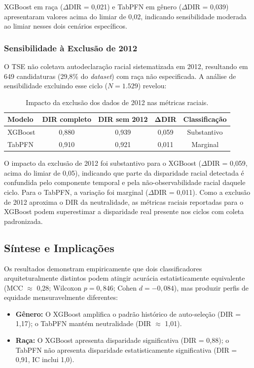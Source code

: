 \documentclass[12pt]{article}
\begin{document}
XGBoost em raça ($\Delta$DIR = 0{,}021) e TabPFN em gênero ($\Delta$DIR = 0{,}039) apresentaram valores acima do limiar de 0{,}02, indicando sensibilidade moderada ao limiar nesses dois cenários específicos.

\subsubsection{Sensibilidade à Exclusão de 2012}

O TSE não coletava autodeclaração racial sistematizada em 2012, resultando em 649 candidaturas (29,8\% do \textit{dataset}) com raça não especificada. A análise de sensibilidade excluindo esse ciclo ($N = 1.529$) revelou:

\begin{table}[htbp]
\centering
\caption{Impacto da exclusão dos dados de 2012 nas métricas raciais.}
\label{tab:sensibilidade_2012}
\begin{tabular}{lcccc}
\hline
\textbf{Modelo} & \textbf{DIR completo} & \textbf{DIR sem 2012} & $\boldsymbol{\Delta}$\textbf{DIR} & \textbf{Classificação} \\
\hline
XGBoost & 0,880 & 0,939 & 0,059 & Substantivo \\
TabPFN  & 0,910 & 0,921 & 0,011 & Marginal \\
\hline
\end{tabular}
\end{table}

O impacto da exclusão de 2012 foi substantivo para o XGBoost ($\Delta$DIR = 0{,}059, acima do limiar de 0{,}05), indicando que parte da disparidade racial detectada é confundida pelo componente temporal e pela não-observabilidade racial daquele ciclo. Para o TabPFN, a variação foi marginal ($\Delta$DIR = 0{,}011). Como a exclusão de 2012 aproxima o DIR da neutralidade, as métricas raciais reportadas para o XGBoost podem superestimar a disparidade real presente nos ciclos com coleta padronizada.

\subsection{Síntese e Implicações}

Os resultados demonstram empiricamente que dois classificadores arquiteturalmente distintos podem atingir acurácia estatisticamente equivalente (MCC $\approx$ 0,28; Wilcoxon $p = 0{,}846$; Cohen $d = -0{,}084$), mas produzir perfis de equidade mensuravelmente diferentes:

\begin{itemize}
  \item \textbf{Gênero:} O XGBoost amplifica o padrão histórico de auto-seleção (DIR = 1,17); o TabPFN mantém neutralidade (DIR $\approx$ 1,01).
  \item \textbf{Raça:} O XGBoost apresenta disparidade significativa (DIR = 0,88); o TabPFN não apresenta disparidade estatisticamente significativa (DIR = 0,91, IC inclui 1,0).
\end{itemize}
\end{document}
